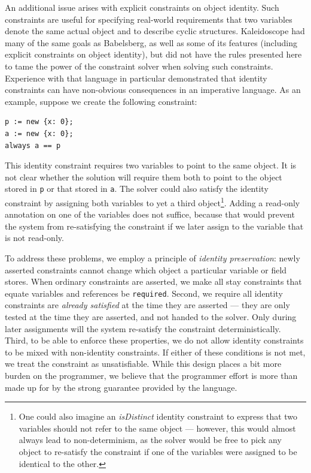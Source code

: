 An additional issue arises with explicit constraints on object
identity.  Such constraints are useful for specifying real-world
requirements that two variables denote the same actual object and to
describe cyclic structures.  Kaleidoscope had many of the same goals
as Babelsberg, as well as some of its features (including explicit
constraints on object identity), but did not have the rules presented
here to tame the power of the constraint solver when solving such
constraints.  Experience with that language in particular demonstrated
that identity constraints can have non-obvious consequences in an
imperative language. As an example, suppose we create the following
constraint:
\begin{lstlisting}
p := new {x: 0};
a := new {x: 0};
always a == p
\end{lstlisting}

This identity constraint requires two variables to point to the same
object.  It is not clear whether the solution will require them both
to point to the object stored in \verb!p! or that stored in \verb!a!.
The solver could also satisfy the identity constraint by assigning
both variables to yet a third object\footnote{One could also imagine
  an \emph{isDistinct} identity constraint to express that two
  variables should not refer to the same object --- however, this would
  almost always lead to non-determinism, as the solver would be free
  to pick any object to re-satisfy the constraint if one of the
  variables were assigned to be identical to the other.}. Adding a
read-only annotation on one of the variables does not suffice, because
that would prevent the system from re-satisfying the constraint if we
later assign to the variable that is not read-only.

To address these problems, we employ a principle of \emph{identity
  preservation}: newly asserted constraints cannot change which object
a particular variable or field stores. When ordinary constraints are
asserted, we make all stay constraints that equate variables and
references be \verb!required!. Second, we require all identity
constraints are \emph{already satisfied} at the time they are asserted
--- they are only tested at the time they are asserted, and not handed
to the solver. Only during later assignments will the system
re-satisfy the constraint deterministically. Third, to be able to
enforce these properties, we do not allow identity constraints to be
mixed with non-identity constraints. If either of these conditions is
not met, we treat the constraint as unsatisfiable. While this design
places a bit more burden on the programmer, we believe that the
programmer effort is more than made up for by the strong guarantee
provided by the language.

